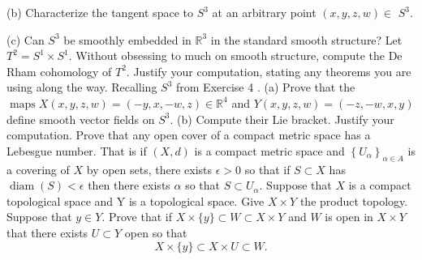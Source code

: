\documentclass[10pt]{article}
\begin{document}
(b) Characterize the tangent space to $S^{3}$ at an arbitrary point $(x, y, z, w) \in$ $S^{3}$.

(c) Can $S^{3}$ be smoothly embedded in $\mathbb{R}^{3}$ in the standard smooth structure?
\newpage
Let $T^{2}=S^{1} \times S^{1}$. Without obsessing to much on smooth structure, compute the De Rham cohomology of $T^{2}$. Justify your computation, stating any theorems you are using along the way.
\newpage
Recalling $S^{3}$ from Exercise 4 .
(a) Prove that the $\operatorname{maps} X(x, y, z, w)=(-y, x,-w, z) \in \mathbb{R}^{4}$ and $Y(x, y, z, w)=(-z,-w, x, y)$ define smooth vector fields on $S^{3}$.
(b) Compute their Lie bracket. Justify your computation.
\newpage
Prove that any open cover of a compact metric space has a Lebesgue number. That is if $(X, d)$ is a compact metric space and $\left\{U_{\alpha}\right\}_{\alpha \in A}$ is a covering of $X$ by open sets, there exists $\epsilon>0$ so that if $S \subset X$ has $\operatorname{diam}(S)<\epsilon$ then there exists $\alpha$ so that $S \subset U_{\alpha}$.
\newpage
Suppose that $X$ is a compact topological space and $\mathrm{Y}$ is a topological space. Give $X \times Y$ the product topology. Suppose that $y \in Y$. Prove that if $X \times\{y\} \subset W \subset X \times Y$ and $W$ is open in $X \times Y$ that there exists $U \subset Y$ open so that
$$
X \times\{y\} \subset X \times U \subset W .
$$
\newpage
\end{document}
